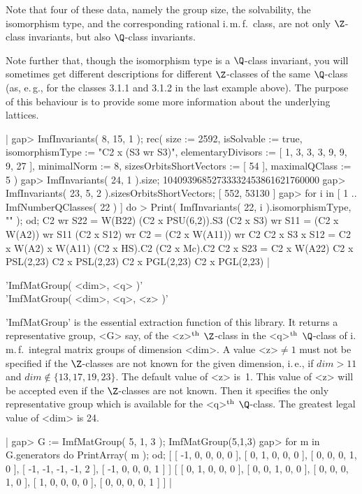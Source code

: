 Note that four of these data, namely the group size, the solvability, the
isomorphism type,  and the  corresponding rational  i.\,m.\,f.~class, are
not only $\Z$-class invariants, but also $\Q$-class invariants.

Note further that, though the isomorphism type is a $\Q$-class invariant,
you will sometimes get  different descriptions for different $\Z$-classes
of the  same $\Q$-class (as, e.\,g., for  the classes 3.1.1 and  3.1.2 in
the last example above). The purpose of this behaviour is to provide some
more information about the underlying lattices.

|    gap> ImfInvariants( 8, 15, 1 );
    rec(
      size := 2592,
      isSolvable := true,
      isomorphismType := "C2 x (S3 wr S3)",
      elementaryDivisors := [ 1, 3, 3, 3, 9, 9, 9, 27 ],
      minimalNorm := 8,
      sizesOrbitsShortVectors := [ 54 ],
      maximalQClass := 5 )
    gap> ImfInvariants( 24, 1 ).size;
    10409396852733332453861621760000
    gap> ImfInvariants( 23, 5, 2 ).sizesOrbitsShortVectors;
    [ 552, 53130 ]
    gap> for i in [ 1 .. ImfNumberQClasses( 22 ) ] do
    >    Print( ImfInvariants( 22, i ).isomorphismType, "\n" ); od;
    C2 wr S22 = W(B22)
    (C2 x PSU(6,2)).S3
    (C2 x S3) wr S11 = (C2 x W(A2)) wr S11
    (C2 x S12) wr C2 = (C2 x W(A11)) wr C2
    C2 x S3 x S12 = C2 x W(A2) x W(A11)
    (C2 x HS).C2
    (C2 x Mc).C2
    C2 x S23 = C2 x W(A22)
    C2 x PSL(2,23)
    C2 x PSL(2,23)
    C2 x PGL(2,23)
    C2 x PGL(2,23) |

\vspace{5mm}
'ImfMatGroup( <dim>, <q> )'%
 \\
'ImfMatGroup( <dim>, <q>, <z> )'

'ImfMatGroup' is the essential extraction   function of this library.  It
returns a representative group, <G> say, of the <z>$^{\rm th}$ $\Z$-class
in the <q>$^{\rm th}$ $\Q$-class of  i.\,m.\,f.~integral matrix groups of
dimension <dim>. A   value <z>$ \neq  1$  must  not be specified  if  the
$\Z$-classes are not known for the given dimension, i.\,e., if $dim > 11$
and $dim \not \in \{13,17,19,23\}$. The default  value of <z> is~1.  This
value  of  <z> will    be accepted even   if   the $\Z$-classes  are  not
known. Then it specifies the only representative group which is available
for the <q>$^{\rm th}$  $\Q$-class. The greatest  legal value of <dim> is
24.

|    gap> G := ImfMatGroup( 5, 1, 3 );
    ImfMatGroup(5,1,3)
    gap> for m in G.generators do PrintArray( m ); od;
    [ [  -1,   0,   0,   0,   0 ],
      [   0,   1,   0,   0,   0 ],
      [   0,   0,   0,   1,   0 ],
      [  -1,  -1,  -1,  -1,   2 ],
      [  -1,   0,   0,   0,   1 ] ]
    [ [  0,  1,  0,  0,  0 ],
      [  0,  0,  1,  0,  0 ],
      [  0,  0,  0,  1,  0 ],
      [  1,  0,  0,  0,  0 ],
      [  0,  0,  0,  0,  1 ] ] |

